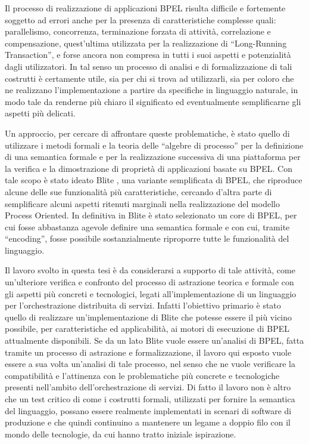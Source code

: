 Il processo di realizzazione di applicazioni BPEL risulta difficile e fortemente
soggetto ad errori anche per la presenza di caratteristiche complesse quali:
parallelismo, concorrenza, terminazione forzata di attività, correlazione e
compensazione, quest'ultima utilizzata per la realizzazione di ``Long-Running
Transaction'', e forse ancora non compresa in tutti i suoi aspetti e potenzialità
dagli utilizzatori. In tal senso un processo di analisi e di
formalizzazione di tali costrutti è certamente utile, sia per chi si trova ad
utilizzarli, sia per coloro che ne realizzano l'implementazione a partire da
specifiche in linguaggio naturale, in modo tale da renderne più chiaro il
significato ed eventualmente semplificarne gli aspetti più delicati.

Un approccio, per cercare di affrontare queste problematiche, è stato quello di
utilizzare i metodi formali e la teoria delle ``algebre di processo'' per la
definizione di una semantica formale e per la realizzazione successiva di una
piattaforma per la verifica e la dimostrazione di proprietà di applicazioni
basate su BPEL. Con tale scopo è stato ideato Blite \cite{LaPuTie1}, una
variante semplificata di BPEL, che riproduce alcune delle sue funzionalità più
caratteristiche, cercando d'altra parte di semplificare alcuni aspetti ritenuti
marginali nella realizzazione del modello Process Oriented. In definitiva in
Blite è stato selezionato un core di BPEL, per cui fosse abbastanza agevole
definire una semantica formale e con cui, tramite ``encoding'', fosse possibile
sostanzialmente riproporre tutte le funzionalità del linguaggio.

Il lavoro svolto in questa tesi è da considerarsi a supporto di tale attività,
come un'ulteriore verifica e confronto del processo di astrazione teorica e
formale con gli aspetti più concreti e tecnologici, legati all'implementazione di
un linguaggio per l'orchestrazione distribuita di servizi. Infatti l'obiettivo
primario è stato quello di realizzare un'implementazione di Blite che potesse
essere il più vicino possibile, per caratteristiche ed applicabilità, ai motori
di esecuzione di BPEL attualmente disponibili. Se da un lato Blite vuole essere
un'analisi di BPEL, fatta tramite un processo di astrazione e formalizzazione,
il lavoro qui esposto vuole essere a sua volta un'analisi di tale processo, nel
senso che ne vuole verificare la compatibilità e l'attinenza con le problematiche
più concrete e tecnologiche presenti nell'ambito dell'orchestrazione di servizi.
Di fatto il lavoro non è altro che un test critico di come i costrutti formali,
utilizzati per fornire la semantica del linguaggio, possano essere realmente
implementati in scenari di software di produzione e che quindi continuino a
mantenere un legame a doppio filo con il mondo delle tecnologie, da cui hanno
tratto iniziale ispirazione. 

